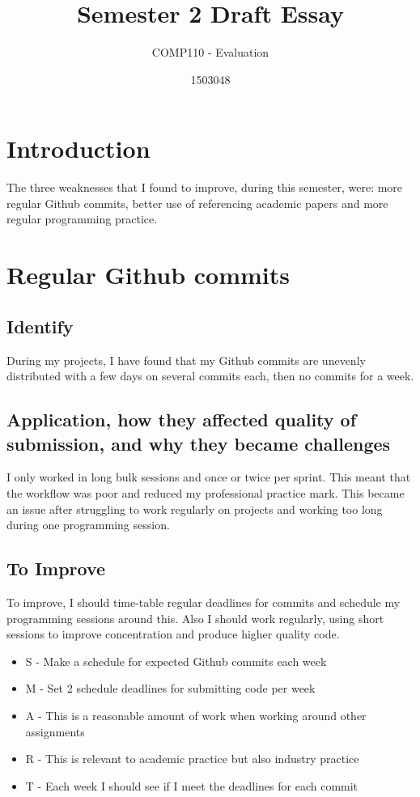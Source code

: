 \documentclass{scrartcl}
\title{Semester 2 Draft Essay}
\subtitle{COMP110 - Evaluation}
\author{1503048}
\begin{document}
\maketitle

\section*{Introduction}
The three weaknesses that I found to improve, during this semester, were: more regular Github commits, better use of referencing academic papers and more regular programming practice.

\section*{Regular Github commits}
\subsection*{Identify}
During my projects, I have found that my Github commits are unevenly distributed with a few days on several commits each, then no commits for a week.

\subsection*{Application, how they affected quality of submission, and why they became challenges}
I only worked in long bulk sessions and once or twice per sprint. This meant that the workflow was poor and reduced my professional practice mark. This became an issue after struggling to work regularly on projects and working too long during one programming session.

\subsection*{To Improve}
To improve, I should time-table regular deadlines for commits and schedule my programming sessions around this. Also I should work regularly, using short sessions to improve concentration and produce higher quality code.

 \begin{itemize}
   \item  S - Make a schedule for expected Github commits each week
	\item M - Set 2 schedule deadlines for submitting code per week
	\item A - This is a reasonable amount of work when working around other assignments
	\item R - This is relevant to academic practice but also industry practice
	\item T - Each week I should see if I meet the deadlines for each commit
 \end{itemize}
\end{document}
